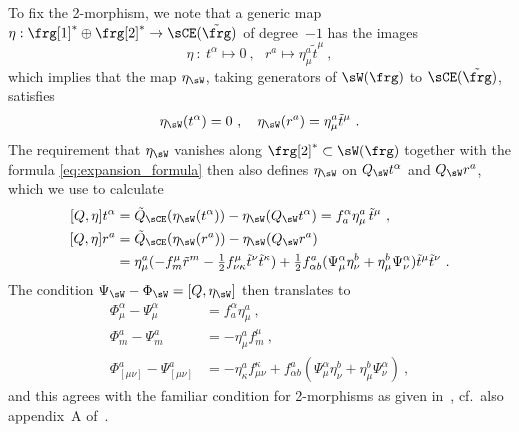 \documentclass[reqno,a4paper,11pt]{article}
\begin{document}
To fix the 2-morphism, we note that a generic map $\eta:\frg[1]^*\oplus \frg[2]^*\rightarrow \sCE(\tilde \frg)$ of degree~$-1$ has the images
\begin{equation}
\eta~:~t^\alpha\mapsto 0~,~~~
r^a\mapsto \eta^a_\mu \tilde t^\mu~,
\end{equation}
which implies that the map $\eta_\sW$, taking generators of $\sW(\frg)$ to $\sCE(\tilde \frg)$, satisfies
\begin{equation}
\eta_\sW (t^\alpha) = 0~,~~~
\eta_\sW (r^a) = \eta^a_\mu \tilde t^\mu~.
\end{equation}
The requirement that $\eta_\sW$ vanishes along $\frg[2]^*\subset\sW(\frg)$ together with the formula \eqref{eq:expansion_formula} then also defines $\eta_\sW$ on $Q_\sW t^\alpha$ and $Q_\sW r^a$, which we use to calculate
\begin{equation}
\begin{aligned}
[Q,\eta] t^\alpha &= \tilde Q_\sCE(\eta_\sW(t^\alpha))-\eta_\sW(Q_\sW t^\alpha)= f^\alpha_a\eta^a_\mu \, \tilde t^{\mu}~,\\
[Q,\eta] r^a &= \tilde Q_\sCE(\eta_\sW(r^a))-\eta_\sW( Q_\sW r^a)\\
&=\eta^a_\mu(-f^\mu_m\tilde r^m-\tfrac12 f^\mu_{\nu\kappa}\tilde t^\nu\tilde t^\kappa)+\tfrac12 f^a_{\alpha b}(\Psi^\alpha_\mu \eta^b_\nu+\eta^b_\mu\Psi^\alpha_\nu)\tilde t^\mu \tilde t^\nu~.
\end{aligned}
\end{equation}
The condition $\Psi_\sW-\Phi_\sW=[Q,\eta_\sW]$ then translates to
\begin{equation}
\begin{aligned}
\Phi^\alpha_\mu-\Psi^\alpha_\mu &= f^\alpha_a \eta^a_\mu~,\\
\Phi^a_m - \Psi^a_m &= - \eta^a_\mu f^\mu_m~,\\
\Phi^a_{\left[\mu\nu\right]}-\Psi^a_{\left[\mu\nu\right]} &= -\eta^a_\kappa f^\kappa_{\mu\nu}+f^a_{\alpha b} (\Psi^\alpha_\mu\eta^b_\nu+\eta_\mu^b\Psi^\alpha_\nu)~,
\end{aligned}
\end{equation}
and this agrees with the familiar condition for 2-morphisms as given in~\cite{Baez:2009:aa}, cf.\ also appendix~A of~\cite{Sati:2008eg}.
\end{document}
